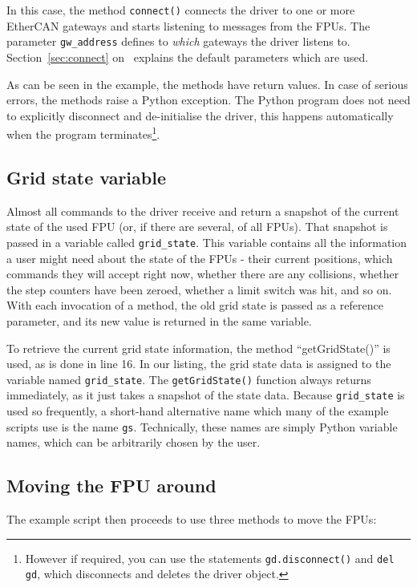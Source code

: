 \documentclass[11pt,a4paper]{scrartcl}
\begin{document}
In this case, the method \texttt{connect()} connects the driver to one
or more EtherCAN gateways and starts listening to messages from the
FPUs. The parameter \texttt{gw\_address} defines to \emph{which}
gateways the driver listens to. Section~\ref{sec:connect}
on~\pageref{sec:connect} explains the default parameters which are
used.

As can be seen in the example, the methods have return values.  In
case of serious errors, the methods raise a Python exception. The
Python program does not need to explicitly disconnect and
de-initialise the driver, this happens automatically when the program
terminates\footnote{However if required, you can use the statements
  \texttt{gd.disconnect()} and \texttt{del gd}, which disconnects and
  deletes the driver object.}.



\subsection{Grid state variable}
 Almost all commands to the driver
receive and return a snapshot of the current state of the used FPU
(or, if there are several, of all FPUs). That snapshot is passed in a
variable called \texttt{grid\_state}. This variable contains all the
information a user might need about the state of the FPUs - their
current positions, which commands they will accept right now, whether
there are any collisions, whether the step counters have been zeroed,
whether a limit switch was hit, and so on. With each invocation of a
method, the old grid state is passed as a reference parameter, and its
new value is returned in the same variable.

To retrieve the current grid state information, the method
``getGridState()'' is used, as is done in line 16. In our listing, the
grid state data is assigned to the variable named
\texttt{grid\_state}.  The \texttt{getGridState()} function always
returns immediately, as it just takes a snapshot of the state
data. Because \texttt{grid\_state} is used so frequently, a short-hand
alternative name which many of the example scripts use is the name
\texttt{gs}.  Technically, these names are simply Python variable
names, which can be arbitrarily chosen by the user.

\subsection{Moving the FPU around}
The example script then proceeds to use three methods to move
the FPUs:
\end{document}
